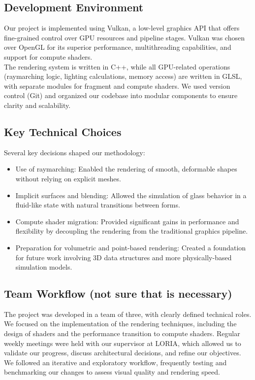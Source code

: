 \documentclass{rapportcs}
\begin{document}
\subsection{Development Environment}
Our project is implemented using Vulkan, a low-level graphics API that offers fine-grained control over GPU resources and pipeline stages. Vulkan was chosen over OpenGL for its superior performance, multithreading capabilities, and support for compute shaders.\\

The rendering system is written in C++, while all GPU-related operations (raymarching logic, lighting calculations, memory access) are written in GLSL, with separate modules for fragment and compute shaders. We used version control (Git) and organized our codebase into modular components to ensure clarity and scalability.

\newpage
\subsection{Key Technical Choices}
Several key decisions shaped our methodology:\\

\begin{itemize}
    \item Use of raymarching: Enabled the rendering of smooth, deformable shapes without relying on explicit meshes.\\
    
    \item Implicit surfaces and blending: Allowed the simulation of glass behavior in a fluid-like state with natural transitions between forms.\\
    
    \item Compute shader migration: Provided significant gains in performance and flexibility by decoupling the rendering from the traditional graphics pipeline.\\
    
    \item Preparation for volumetric and point-based rendering: Created a foundation for future work involving 3D data structures and more physically-based simulation models.\\
    
\end{itemize}

    
 \subsection{Team Workflow (not sure that is necessary)}
 The project was developed in a team of three, with clearly defined technical roles. We focused on the implementation of the rendering techniques, including the design of shaders and the performance transition to compute shaders. Regular weekly meetings were held with our supervisor at LORIA, which allowed us to validate our progress, discuss architectural decisions, and refine our objectives. We followed an iterative and exploratory workflow, frequently testing and benchmarking our changes to assess visual quality and rendering speed.
\end{document}
